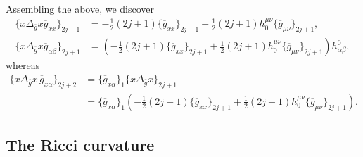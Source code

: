 \documentclass[11pt]{article}
\numberwithin{equation}{section}
\newcommand{\olg}{\overline{g}}
\newcommand{\gbar}{\overline{g}}
\begin{document}
Assembling the above, we discover
\begin{align} \label{eqn:laplacian-asymp-xx}
\{ x \Delta_{\olg} x \gbar_{xx} \}_{2j+1} &= -\frac{1}{2} (2j+1) \{\olg_{xx}\}_{2j+1} +\frac{1}{2} (2j+1) h_0^{\mu\nu}\{\olg_{\mu\nu}\}_{2j+1}, \\
\{ x \Delta_{\olg} x \gbar_{\alpha \beta} \}_{2j+1} &= \left(-\frac{1}{2} (2j+1) \{\olg_{xx}\}_{2j+1} +\frac{1}{2} (2j+1) h_0^{\mu \nu}\{\olg_{\mu\nu}\}_{2j+1} \right)h^0_{\alpha \beta},\label{eqn:laplacian-asymp-ab}
\end{align}
whereas
\begin{align}
\{ x \Delta_{\olg} x \, \gbar_{x \alpha} \}_{2j+2} &= \{ \olg_{x \alpha}\}_1 \{ x \Delta_{\olg} x\}_{2j+1} \nonumber\\
&= \{ \olg_{x \alpha}\}_1 \left( -\frac{1}{2} (2j+1) \{\olg_{xx}\}_{2j+1} +\frac{1}{2} (2j+1) h_0^{\mu \nu}\{\olg_{\mu \nu}\}_{2j+1}\right). \label{eqn:mixed-ref-2}
\end{align}

\subsection*{The Ricci curvature}
\end{document}
